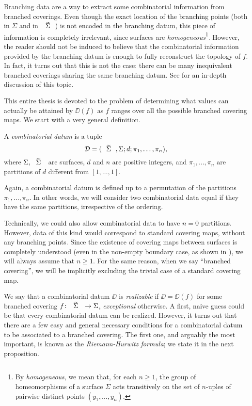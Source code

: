 Branching data are a way to extract some combinatorial information from branched coverings. Even though the exact location of the branching points (both in $\Sigma$ and in $\tSigma$) is not encoded in the branching datum, this piece of information is completely irrelevant, since surfaces are \emph{homogeneous}\footnote{By \emph{homogeneous}, we mean that, for each $n\ge 1$, the group of homeomorphisms of a surface $\Sigma$ acts transitively on the set of $n$-uples of pairwise distinct points $(y_1,\ldots,y_n)$.}. However, the reader should not be induced to believe that the combinatorial information provided by the branching datum is enough to fully reconstruct the topology of $f$. In fact, it turns out that this is not the case: there can be many inequivalent branched coverings sharing the same branching datum. See \cite{sarti} for an in-depth discussion of this topic.

This entire thesis is devoted to the problem of determining what values can actually be attained by $\DD(f)$ as $f$ ranges over all the possible branched covering maps. We start with a very general definition.

\begin{definition}
A \emph{combinatorial datum} is a tuple
\[
\DD=\datum{\tSigma,\Sigma}{d}{\pi_1,\ldots,\pi_n},
\]
where $\Sigma,\tSigma$ are surfaces, $d$ and $n$ are positive integers, and $\pi_1,\ldots,\pi_n$ are partitions of $d$ different from $[1,\ldots,1]$.
\end{definition}

Again, a combinatorial datum is defined up to a permutation of the partitions $\pi_1,\ldots,\pi_n$. In other words, we will consider two combinatorial data equal if they have the same partitions, irrespective of the ordering.

Technically, we could also allow combinatorial data to have $n=0$ partitions. However, data of this kind would correspond to standard covering maps, without any branching points. Since the existence of covering maps between surfaces is completely understood  (even in the non-empty boundary case, as shown in \cite{massey-covering}), we will always assume that $n\ge 1$. For the same reason, when we say ``branched covering'', we will be implicitly excluding the trivial case of a standard covering map.

We say that a combinatorial datum $\DD$ is \emph{realizable} if $\DD=\DD(f)$ for some branched covering $\map{f}{\tSigma}{\Sigma}$, \emph{exceptional} otherwise. A first, naive guess could be that every combinatorial datum can be realized. However, it turns out that there are a few easy and general necessary conditions for a combinatorial datum to be associated to a branched covering. The first one, and arguably the most important, is known as the \emph{Riemann-Hurwitz formula}; we state it in the next proposition.

